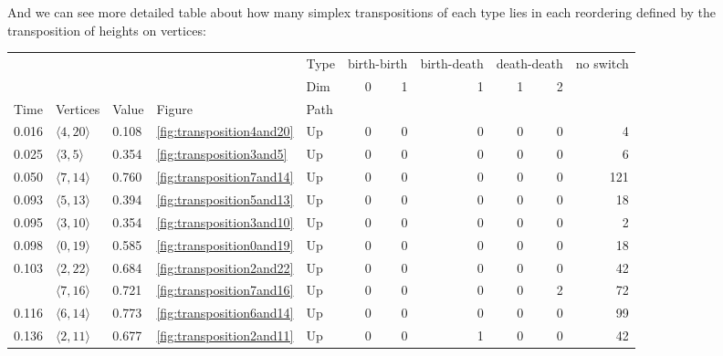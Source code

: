 \documentclass{article}
\begin{document}
\par And we can see more detailed table about how many simplex transpositions of each type lies in each reordering defined by the transposition of heights on vertices:
\begin{center}
\begin{tabular}{lllllrrrrrr}
\toprule
 &  &  &  & Type & \multicolumn{2}{r}{birth-birth} & birth-death & \multicolumn{2}{r}{death-death} & no switch \\
 &  &  &  & Dim & 0 & 1 & 1 & 1 & 2 &  \\
Time & Vertices & Value & Figure & Path &  &  &  &  &  &  \\
\midrule
0.016 & $\langle4, 20\rangle$ & 0.108 & \ref{fig:transposition4and20} & Up & 0 & 0 & 0 & 0 & 0 & 4 \\
\cline{1-11} \cline{2-11} \cline{3-11} \cline{4-11}
0.025 & $\langle3, 5\rangle$ & 0.354 & \ref{fig:transposition3and5} & Up & 0 & 0 & 0 & 0 & 0 & 6 \\
\cline{1-11} \cline{2-11} \cline{3-11} \cline{4-11}
0.050 & $\langle7, 14\rangle$ & 0.760 & \ref{fig:transposition7and14} & Up & 0 & 0 & 0 & 0 & 0 & 121 \\
\cline{1-11} \cline{2-11} \cline{3-11} \cline{4-11}
0.093 & $\langle5, 13\rangle$ & 0.394 & \ref{fig:transposition5and13} & Up & 0 & 0 & 0 & 0 & 0 & 18 \\
\cline{1-11} \cline{2-11} \cline{3-11} \cline{4-11}
0.095 & $\langle3, 10\rangle$ & 0.354 & \ref{fig:transposition3and10} & Up & 0 & 0 & 0 & 0 & 0 & 2 \\
\cline{1-11} \cline{2-11} \cline{3-11} \cline{4-11}
0.098 & $\langle0, 19\rangle$ & 0.585 & \ref{fig:transposition0and19} & Up & 0 & 0 & 0 & 0 & 0 & 18 \\
\cline{1-11} \cline{2-11} \cline{3-11} \cline{4-11}
\multirow[t]{2}{*}{0.103} & $\langle2, 22\rangle$ & 0.684 & \ref{fig:transposition2and22} & Up & 0 & 0 & 0 & 0 & 0 & 42 \\
\cline{2-11} \cline{3-11} \cline{4-11}
 & $\langle7, 16\rangle$ & 0.721 & \ref{fig:transposition7and16} & Up & 0 & 0 & 0 & 0 & 2 & 72 \\
\cline{1-11} \cline{2-11} \cline{3-11} \cline{4-11}
0.116 & $\langle6, 14\rangle$ & 0.773 & \ref{fig:transposition6and14} & Up & 0 & 0 & 0 & 0 & 0 & 99 \\
\cline{1-11} \cline{2-11} \cline{3-11} \cline{4-11}
0.136 & $\langle2, 11\rangle$ & 0.677 & \ref{fig:transposition2and11} & Up & 0 & 0 & 1 & 0 & 0 & 42 \\
\cline{1-11} \cline{2-11} \cline{3-11} \cline{4-11}

\end{tabular}
\end{center}
\end{document}
